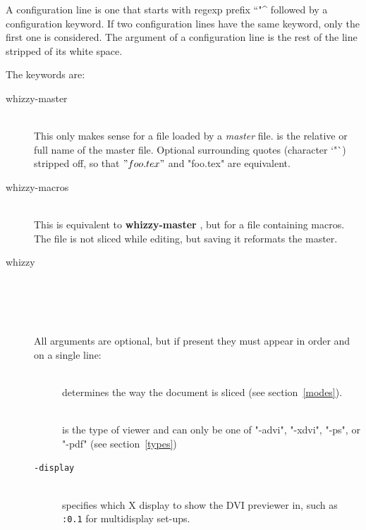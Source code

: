 \documentclass[12pt]{article}
\begin{document}
A configuration line is one that starts with regexp prefix ``\lst"^%
followed by a configuration keyword.  If two configuration lines have the same
keyword, only the first one is considered. The argument of a configuration
line is the rest of the line stripped of its white space.

The keywords are:
\begin{description}
\item[whizzy-master]
\\
This only makes sense for a file loaded by a {\em master} file.
 is the relative or full name of the
master file. Optional surrounding quotes (character \lst`"`) %
%
stripped off, so that \lst$"foo.tex"$ and \lst"foo.tex" are equivalent.

\item[whizzy-macros]
\\
  This is equivalent to {\bf whizzy-master} , but for a file
  containing   macros. The file is not sliced while editing, but
  saving it reformats the master.

\item[whizzy]
\\
 \\
\\
\\[1em]
All arguments are optional, but if present they must appear in order and on
a single line:
\begin{description}
\item[]\indent\\
determines the way the document is sliced
(see section~\ref{modes}).

\item[]\indent\\
is the type of viewer and can only be one of
\lst"-advi", \lst"-xdvi", \lst"-ps", or \lst"-pdf" (see section~\ref{types})

\item[\texttt{-display} ]\indent\\
specifies which X display to show the DVI previewer in,
such as \texttt{:0.1} for multidisplay set-ups.


\end{description}
\end{description}
\end{document}
